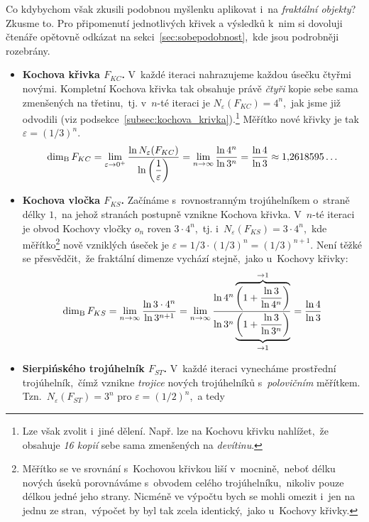 Co kdybychom však zkusili podobnou myšlenku aplikovat i~na \emph{fraktální objekty}? Zkusme to. Pro připomenutí jednotlivých křivek a výsledků k~nim si dovoluji čtenáře opětovně odkázat na sekci~\ref{sec:sobepodobnost},~kde jsou podrobněji rozebrány.
\begin{itemize}
    \item \textbf{Kochova křivka $F_{KC}$.} V~každé iteraci nahrazujeme každou úsečku čtyřmi novými. Kompletní Kochova křivka tak obsahuje právě \emph{čtyři} kopie sebe sama zmenšených na třetinu,~tj. v~$n$-té iteraci je $N_\varepsilon(F_{KC})=4^n$,~jak jsme již odvodili (viz podsekce~\ref{subsec:kochova_krivka}).\footnote{Lze však zvolit i~jiné dělení. Např. lze na Kochovu křivku nahlížet,~že obsahuje \emph{16 kopií} sebe sama zmenšených na \emph{devítinu}.} Měřítko nové křivky je tak $\varepsilon=(1/3)^n$.
    \begin{equation}\label{eq:kochova-krivka-dimenze}
        \operatorname{dim_B}{F_{KC}}=\lim_{\varepsilon\to 0^+}{\dfrac{\ln{N_\varepsilon(F_{KC})}}{\ln{\left(\dfrac{1}{\varepsilon}\right)}}}=\lim_{n\to\infty}{\dfrac{\ln{4^n}}{\ln{3^n}}}=\dfrac{\ln{4}}{\ln{3}}\approx 1{,}2618595\dots
    \end{equation}
    \item \textbf{Kochova vločka $F_{KS}$.} Začínáme s~rovnostranným trojúhelníkem o~straně délky $1$,~na jehož stranách postupně vznikne Kochova křivka. V~$n$-té iteraci je obvod Kochovy vločky $o_n$ roven $3\cdot 4^n$,~tj. i~$N_\varepsilon(F_{KS})=3\cdot 4^n$,~kde měřítko\footnote{Měřítko se ve srovnání s~Kochovou křivkou liší v~mocnině,~neboť délku nových úseků porovnáváme s~obvodem celého trojúhelníku,~nikoliv pouze délkou jedné jeho strany. Nicméně ve výpočtu bych se mohli omezit i~jen na jednu ze stran,~výpočet by byl tak zcela identický,~jako u~Kochovy křivky.} nově vzniklých úseček je $\varepsilon=1/3\cdot(1/3)^n=(1/3)^{n+1}$. Není těžké se přesvědčit,~že fraktální dimenze vychází stejně,~jako u~Kochovy křivky:
    \begin{equation}\label{eq:kochova-vlocka-dimenze}
        \operatorname{dim_B}{F_{KS}}=\lim_{n\to\infty}{\dfrac{\ln{3\cdot 4^n}}{\ln{3^{n+1}}}}=\lim_{n\to\infty}{\dfrac{\ln{4^n}\overbrace{\left(1+\dfrac{\ln{3}}{\ln{4^n}}\right)}^{\to 1}}{\ln{3^n}\underbrace{\left(1+\dfrac{\ln{3}}{\ln{3^n}}\right)}_{\to 1}}}=\dfrac{\ln{4}}{\ln{3}}
    \end{equation}
    \item \textbf{Sierpińského trojúhelník $F_{ST}$.} V~každé iteraci vynecháme prostřední trojúhelník,~čímž vznikne \emph{trojice} nových trojúhelníků s~\emph{polovičním} měřítkem. Tzn.~$N_\varepsilon(F_{ST})=3^n$ pro $\varepsilon=(1/2)^n$,~a tedy

\end{itemize}
